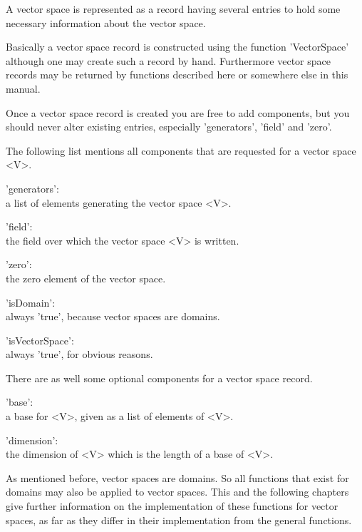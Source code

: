 A vector space is  represented as a {\GAP} record  having several entries
to hold some necessary information about the vector space.

Basically  a  vector  space  record  is constructed  using  the  function
'VectorSpace' although one may create such a  record by hand. Furthermore
vector  space records  may be  returned  by functions  described  here or
somewhere else in this manual.

Once a vector space record is created you are free to add components, but
you should never alter existing entries, especially 'generators', 'field'
and 'zero'.

The following list  mentions  all components  that  are requested  for  a
vector space <V>.

'generators': \\
        a list of elements generating the vector space <V>.

'field': \\
        the field over which the vector space <V> is written.

'zero': \\
        the zero element of the vector space.

'isDomain': \\
        always 'true', because vector spaces are domains.

'isVectorSpace': \\
        always 'true', for obvious reasons.


There are as well some optional components for a vector space record.

'base': \\
        a base for <V>, given as a list of elements of <V>.

'dimension': \\
        the dimension of <V> which is the length of a base of <V>.


%
%
%
%

As  mentioned before,  vector spaces are  domains. So all  functions that
exist for domains may  also be  applied to vector  spaces.  This  and the
following chapters  give  further  information on  the implementation  of
these  functions  for  vector  spaces, as far  as  they  differ in  their
implementation from the general functions.


